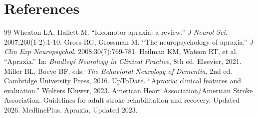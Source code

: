 \section*{References}
\begin{thebibliography}{99}
 Wheaton LA, Hallett M. ``Ideomotor apraxia: a review.'' \textit{J Neurol Sci}. 2007;260(1-2):1-10.
 Gross RG, Grossman M. ``The neuropsychology of apraxia.'' \textit{J Clin Exp Neuropsychol}. 2008;30(7):769-781.
 Heilman KM, Watson RT, et al. ``Apraxia.'' In: \textit{Bradley\'s Neurology in Clinical Practice}, 8th ed. Elsevier, 2021.
 Miller BL, Boeve BF, eds. \textit{The Behavioral Neurology of Dementia}, 2nd ed. Cambridge University Press, 2016.
 UpToDate. ``Apraxia: clinical features and evaluation.'' Wolters Kluwer, 2023.
 American Heart Association/American Stroke Association. Guidelines for adult stroke rehabilitation and recovery. Updated 2026.
 MedlinePlus. Apraxia. Updated 2023.
\end{thebibliography}
